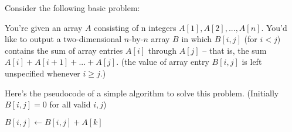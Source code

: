 
Consider the following basic problem:

You're given an array $A$ consisting of n integers $A[1], A[2], ..., A[n]$. You'd like to output a two-dimensional $n$-by-$n$ array $B$ in which $B[i, j]$ (for $i < j$) contains the sum of array entries $A[i]$ through $A[j]$ -- that is, the sum $A[i] + A[i+1] + ... + A[j]$. (the value of array entry $B[i, j]$ is left unspecified whenever $i \ge j$.)

Here's the pseudocode of a simple algorithm to solve this problem. (Initially $B[i,j]=0$ for all valid $i,j$)

\begin{algorithmic}[1]
            \State $B[i,j]\gets B[i,j] + A[k]$
        \EndFor
    \EndFor
\EndFor
\end{algorithmic}

